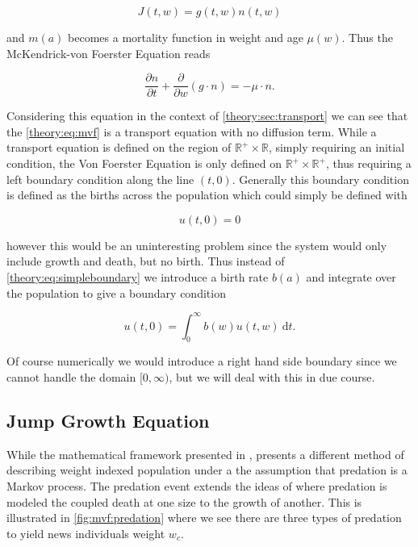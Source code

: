 \documentclass[../main]{subfiles}
\begin{document}
  \begin{equation}
    J(t, w) = g(t, w) n(t, w)
  \end{equation}

  and $m(a)$ becomes a mortality function in weight and age $\mu(w)$. Thus the McKendrick-von Foerster Equation reads

  \begin{equation}\label{theory:eq:mvf}
    \frac{\partial n}{\partial t} + \frac{\partial}{\partial w} \left(g \cdot n \right) = - \mu \cdot n.
  \end{equation}

  Considering this equation in the context of \autoref{theory:sec:transport} we can see that the \autoref{theory:eq:mvf} is a transport equation with no diffusion term. While a transport equation is defined on the region of $\mathbb{R^+} \times \mathbb{R}$, simply requiring an initial condition, the Von Foerster Equation is only defined on $\mathbb{R^+} \times \mathbb{R^+}$, thus requiring a left boundary condition along the line $(t, 0)$. Generally this boundary condition is defined as the births across the population which could simply be defined with

  \begin{equation}\label{theory:eq:simpleboundary}
    u(t, 0) = 0
  \end{equation}

  however this would be an uninteresting problem since the system would only include growth and death, but no birth. Thus instead of \autoref{theory:eq:simpleboundary} we introduce a birth rate $b(a)$ and integrate over the population to give a boundary condition

  \begin{equation}\label{theory:eq:boundary}
    u(t, 0) = \int_0^{\infty} b(w) u(t, w) \: \mathrm{d}t.
  \end{equation}

  Of course numerically we would introduce a right hand side boundary since we cannot handle the domain $[0, \infty)$, but we will deal with this in due course.

  \subsection{Jump Growth Equation}\label{theory:sec:jumpgrowth}
  While the mathematical framework presented in \cite{silvert1978}, \cite{datta2010} presents a different method of describing weight indexed population under a the assumption that predation is a Markov process. The predation event extends the ideas of \cite{silvert1980} where predation is modeled the coupled death at one size to the growth of another. This is illustrated in \autoref{fig:mvf:predation} where we see there are three types of predation to yield news individuals weight $w_c$.
\end{document}
